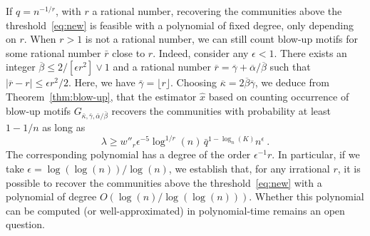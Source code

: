 \documentclass[final]{colt2026}
\newcommand{\1}{\mathbf{1}}
\begin{document}
If $q=n^{-1/r}$, with $r$ a rational number, recovering the communities above the threshold~\eqref{eq:new} is feasible with a polynomial of fixed degree, only depending on $r$. 
When $r>1$ is not a rational number, we can still count blow-up motifs for some rational number $\bar{r}$ close to $r$. Indeed, consider any $\epsilon < 1$. There exists an integer $\overline{\beta}\leq 2/[\epsilon r^2]\vee 1$ and a rational number $\overline{r}= \overline{\gamma}+ \overline{\alpha}/\overline{\beta}$ such that $|\overline{r}-r|\leq \epsilon r^2/2 $. Here, we have $\bar \gamma = \lfloor r \rfloor$. Choosing $\overline{\kappa}= 2\overline{\beta}\overline{\gamma}$, we 
deduce from Theorem~\ref{thm:blow-up}, that  the  estimator $\hat{x}$ based on counting occurrence of blow-up motifs $G_{\bar \kappa,\bar \gamma, \bar \alpha/\bar \beta}$ recovers the communities with probability at least $1-1/n$ as long as 
\[
\lambda \geq w''_{r} \epsilon^{-5} \log^{1/r}(n) \,\bar q^{1-\log_{n}(K)} n^{\epsilon}\ . 
\]
The corresponding polynomial has a degree of the order $\epsilon^{-1} r$. In particular, if we take $\epsilon=\log(\log(n))/\log(n)$, we establish that, for any irrational $r$, it is possible to recover the communities above the threshold~\eqref{eq:new} with a polynomial of degree $O(\log(n)/\log(\log(n)))$. Whether this polynomial can be computed (or well-approximated) in polynomial-time remains an open question. 









%
\end{document}
